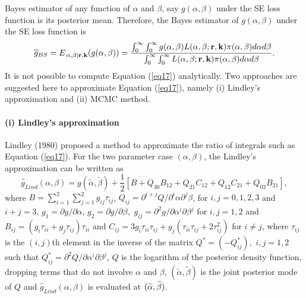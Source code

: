 \documentclass[12pt,a4paper]{article}
\begin{document}
 Bayes estimator of any function of $\alpha $ and $\beta $, say $g(\alpha
,\beta )$ under the SE loss function is its posterior mean. Therefore, the
Bayes estimator of $g(\alpha ,\beta )$ under the SE loss function is%
\begin{equation}
\widehat{g}_{BS}=E_{\left. \alpha ,\beta \right\vert \mathbf{r,k}}(g(\alpha
,\beta ))=\frac{\int_{0}^{\infty }\int_{0}^{\infty }g(\alpha ,\beta
)L(\alpha ,\beta ;\mathbf{r,k})\pi (\alpha ,\beta )d\alpha d\beta }{%
\int_{0}^{\infty }\int_{0}^{\infty }L(\alpha ,\beta ;\mathbf{r,k})\pi
(\alpha ,\beta )d\alpha d\beta }.  \label{eq17}
\end{equation}%
It is not possible to compute Equation (\ref{eq17}) analytically. Two
approaches are suggested here to approximate Equation (\ref{eq17}), namely
(i) Lindley's approximation and (ii) MCMC method.

\paragraph{(i) Lindley's approximation}

Lindley (1980) proposed a method to approximate the ratio of integrals such
as Equation (\ref{eq17}). For the two parameter case $(\alpha ,\beta )$, the Lindley's approximation can be
written as 
\begin{equation}
\widehat{g}_{Lind}(\alpha ,\beta )=g(\widetilde{\alpha },\widetilde{\beta })+%
\frac{1}{2}\left[ B+Q_{30}B_{12}+Q_{21}C_{12}+Q_{12}C_{21}+Q_{03}B_{21}%
\right] ,  \label{eq18}
\end{equation}%
where $B=\sum_{i=1}^{2}\sum_{j=1}^{2}g_{ij}\tau _{ij}$, $Q_{ij}=\partial
^{i+j}Q/\partial ^{i}\alpha \partial ^{j}\beta $, for $i,j=0,1,2,3$ and $%
i+j=3$, $g_{1}=\partial g/\partial \alpha $, $g_{2}=\partial g/\partial
\beta ,$ $g_{ij}=\partial ^{2}g/\partial \alpha ^{i}\partial \beta ^{j}$ for 
$i,j=1,2$ and $B_{ij}=(g_{i}\tau _{ii}+g_{j}\tau _{ij})\tau _{ii}$ and $%
C_{ij}=3g_{i}\tau _{ii}\tau _{ij}+g_{j}(\tau _{ii}\tau _{ij}+2\tau
_{ij}^{2}) $ for $i\neq j$, where $\tau _{ij}$ is the $(i,j)$th element in
the inverse of the matrix $Q^{\ast }=(-Q_{ij}^{\ast }),$ $i,j=1,2$ such that 
$Q_{ij}^{\ast }=\partial ^{2}Q/\partial \alpha ^{i}\partial \beta ^{j}$, $Q$
is the logarithm of the posterior density function, dropping terms that do not involve $\alpha$ and $\beta$,
$(\widetilde{\alpha },%
\widetilde{\beta })$ is the joint posterior mode of $Q$ and $\widehat{g}%
_{Lind}(\alpha ,\beta )$ is evaluated at $(\widetilde{\alpha },\widetilde{%
\beta })$.
\end{document}
